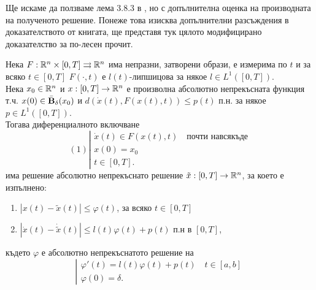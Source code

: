 Ще искаме да ползваме лема 3.8.3 в \cite{DeimlingMulti}, но с допълнителна оценка на производната на полученото решение. Понеже това изисква допълнителни разсъждения в доказателството от книгата, ще представя тук цялото модифицирано доказателство за по-лесен прочит.
\begin{lemma}[Филипов] \label{Filippov}
    Нека $F:\mathbb{R}^n\times [0, T]\rightrightarrows \mathbb{R}^n$ има непразни, затворени образи, е измерима по $t$ и за всяко $t\in [0, T]$ $F(\cdot, t)$ е $l(t)$-липшицова за някое $l\in L^1([0,T])$.\\
    Нека $x_0\in\mathbb{R}^n$ и $x:[0,T]\to\mathbb{R}^n$ е произволна абсолютно непрекъсната функция т.ч. $x(0)\in\bar{\textbf{B}}_{\delta}(x_0)$ и $d(\dot{x}(t), F(x(t),t)) \leq p(t)$ п.н. за някое $p\in L^1([0,T])$.\\
    Тогава диференциалното включване
    \[
        (1) \left|
        \begin{array}{ll}
            \dot{x}(t)\in F(x(t),t) \quad \text{почти навсякъде}\\
            x(0) = x_0\\
            t \in [0, T].
        \end{array}
        \right.
    \]
    има решение абсолютно непрекъснато решение $\tilde{x}:[0,T]\to\mathbb{R}^n$, за което е изпълнено:
    \begin{enumerate}
        \item $|x(t)-\tilde{x}(t)| \leq \varphi(t)$, за всяко $t\in[0,T]$
        \item $|\dot{x}(t)-\dot{\tilde{x}}(t)| \leq l(t)\varphi(t) + p(t)$ п.н в $[0,T]$,
    \end{enumerate}
    където $\varphi$ е абсолютно непрекъснатото решение на
    \[
        \left|
        \begin{array}{ll}
            \varphi'(t) = l(t)\varphi(t) + p(t)\quad t\in[a,b]\\
            \varphi(0) = \delta.
        \end{array}
        \right.
    \]
\end{lemma}
